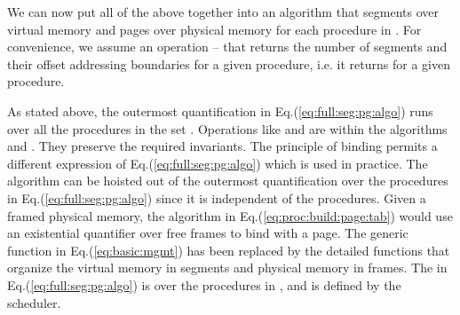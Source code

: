 \documentclass[draft]{article}
\begin{document}
We  can now  put all  of  the above  together into  an algorithm  that
segments over virtual memory  and pages over physical memory
  for  each  procedure  in  .  For  convenience,  we  assume  an
operation  --  that  returns the  number of  segments and
their  offset addressing  boundaries for  a given  procedure,  i.e. it
returns    for  a  given
procedure.


As     stated    above,     the     outermost    quantification     in
Eq.(\ref{eq:full:seg:pg:algo}) runs over all the procedures in the set
.   Operations  like    and   are  within  the
algorithms    and   .   They  preserve  the  required
invariants.  The  principle of binding permits  a different expression
of  Eq.(\ref{eq:full:seg:pg:algo})  which is  used  in practice.   The
   algorithm  can   be   hoisted  out   of  the   outermost
quantification  over the procedures  in Eq.(\ref{eq:full:seg:pg:algo})
since it  is independent of  the procedures.  Given a  framed physical
memory,  the  algorithm  in Eq.(\ref{eq:proc:build:page:tab})
would use  an existential quantifier over  free frames to  bind with a
page.  The generic  function in Eq.(\ref{eq:basic:mgmt}) has been
replaced by the detailed functions that organize the virtual memory in
segments   and   physical   memory    in   frames.    The      in
Eq.(\ref{eq:full:seg:pg:algo}) is  over the procedures in  , and is
defined by the scheduler.
\end{document}

